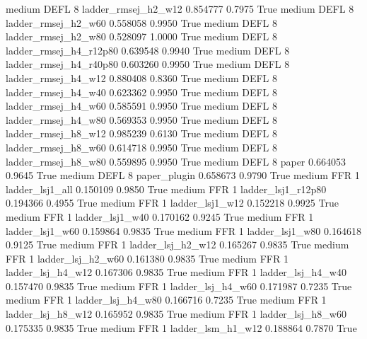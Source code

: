     medium     DEFL                 8    ladder_rmsej_h2_w12   0.854777      0.7975    True
    medium     DEFL                 8    ladder_rmsej_h2_w60   0.558058      0.9950    True
    medium     DEFL                 8    ladder_rmsej_h2_w80   0.528097      1.0000    True
    medium     DEFL                 8 ladder_rmsej_h4_r12p80   0.639548      0.9940    True
    medium     DEFL                 8 ladder_rmsej_h4_r40p80   0.603260      0.9950    True
    medium     DEFL                 8    ladder_rmsej_h4_w12   0.880408      0.8360    True
    medium     DEFL                 8    ladder_rmsej_h4_w40   0.623362      0.9950    True
    medium     DEFL                 8    ladder_rmsej_h4_w60   0.585591      0.9950    True
    medium     DEFL                 8    ladder_rmsej_h4_w80   0.569353      0.9950    True
    medium     DEFL                 8    ladder_rmsej_h8_w12   0.985239      0.6130    True
    medium     DEFL                 8    ladder_rmsej_h8_w60   0.614718      0.9950    True
    medium     DEFL                 8    ladder_rmsej_h8_w80   0.559895      0.9950    True
    medium     DEFL                 8                  paper   0.664053      0.9645    True
    medium     DEFL                 8           paper_plugin   0.658673      0.9790    True
    medium      FFR                 1        ladder_lsj1_all   0.150109      0.9850    True
    medium      FFR                 1     ladder_lsj1_r12p80   0.194366      0.4955    True
    medium      FFR                 1        ladder_lsj1_w12   0.152218      0.9925    True
    medium      FFR                 1        ladder_lsj1_w40   0.170162      0.9245    True
    medium      FFR                 1        ladder_lsj1_w60   0.159864      0.9835    True
    medium      FFR                 1        ladder_lsj1_w80   0.164618      0.9125    True
    medium      FFR                 1      ladder_lsj_h2_w12   0.165267      0.9835    True
    medium      FFR                 1      ladder_lsj_h2_w60   0.161380      0.9835    True
    medium      FFR                 1      ladder_lsj_h4_w12   0.167306      0.9835    True
    medium      FFR                 1      ladder_lsj_h4_w40   0.157470      0.9835    True
    medium      FFR                 1      ladder_lsj_h4_w60   0.171987      0.7235    True
    medium      FFR                 1      ladder_lsj_h4_w80   0.166716      0.7235    True
    medium      FFR                 1      ladder_lsj_h8_w12   0.165952      0.9835    True
    medium      FFR                 1      ladder_lsj_h8_w60   0.175335      0.9835    True
    medium      FFR                 1      ladder_lsm_h1_w12   0.188864      0.7870    True
